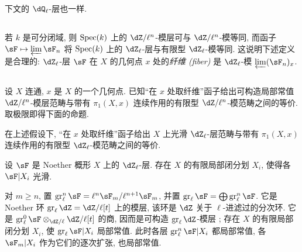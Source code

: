 下文的 $\dQ_\ell$-层也一样.

\subsection{}\label{II:2-2}

若 $k$ 是可分闭域, 则 $\operatorname{Spec}(k)$ 上的 $\dZ/\ell^n$-模层可与 $\dZ/\ell^n$-模等同, 而函子 $\sF\mapsto \varprojlim \sF_n$ 将 $\operatorname{Spec}(k)$ 上的 $\dZ_\ell$-层与有限型 $\dZ_\ell$-模等同. 这说明下述定义是合理的: $\dZ_\ell$-层 $\sF$ 在 $X$ 的几何点 $x$ 处的\emph{纤维 (fiber)} 是 $\dZ_\ell$-模 $\varprojlim (\sF_n)_x$.

\subsection{}\label{II:2-3}

设 $X$ 连通, $x$ 是 $X$ 的一个几何点. 已知“在 $x$ 处取纤维”函子给出可构造局部常值 $\dZ/\ell^n$-模层范畴与带有 $\pi_1(X,x)$ 连续作用的有限型 $\dZ/\ell^n$-模范畴之间的等价. 取极限即得下面的命题.

\begin{proposition_}\label{II:2-4}
在上述假设下, “在 $x$ 处取纤维”函子给出 $X$ 上光滑 $\dZ_\ell$-层范畴与带有 $\pi_1(X,x)$ 连续作用的有限型 $\dZ_\ell$-模范畴之间的等价.
\end{proposition_}

\begin{proposition_}\label{II:2-5}
设 $\sF$ 是 Noether 概形 $X$ 上的 $\dZ_\ell$-层. 存在 $X$ 的有限局部闭分划 $X_i$, 使得各 $\sF|X_i$ 光滑.
\end{proposition_}

对 $m\geqslant n$, 置 $\gr_\ell^n\sF=\ell^n\sF_m/\ell^{n+1}\sF_m$, 并置 $\gr_\ell\sF=\bigoplus \gr_\ell^n\sF$. 它是 Noether 环 $\gr_\ell\dZ=\dZ/\ell[t]$ 上的模层, 该环是 $\dZ$ 关于 $\ell$-进滤过的分次环. 它是 $\gr_\ell^0\sF \otimes_{\dZ/\ell} \dZ/\ell[t]$ 的商, 因而是可构造 $\gr_\ell\dZ$-模层 \cite[IX.2]{sga4}; 存在 $X$ 的有限局部闭分划 $X_i$, 使 $\gr_\ell \sF|X_i$ 局部常值. 此时各层 $\gr_\ell^n\sF|X_i$ 都局部常值, 各 $\sF_m|X_i$ 作为它们的逐次扩张, 也局部常值.

\subsection{}\label{II:2-6}

